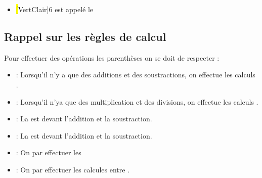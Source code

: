 \begin{definitionbox}
\begin{itemize}[label=\textbullet]
\begin{itemize}[label=\textbullet]
                \item \hl[VertClair]{6} est appelé le 
            \end{itemize} 


    \end{itemize}
\end{definitionbox}

\subsection{Rappel sur les règles de calcul}
\begin{propbox}
    Pour effectuer des opérations  les parenthèses on se doit de
    respecter :
    \begin{itemize}[label=\textbullet]
        \item {} : Lorsqu'il n'y a que des additions et des
            soustractions, on effectue les calculs .
        \item {} : Lorsqu'il n'ya que des multiplication et des
            divisions, on effectue les calculs .
        \item {} : La  est  devant
            l'addition et la soustraction.
        \item {} : La  est  devant
            l'addition et la soustraction.
        \item {} : On  par effectuer les 
        \item {} : On  par effectuer les calcules entre
            .
    \end{itemize}
\end{propbox}

